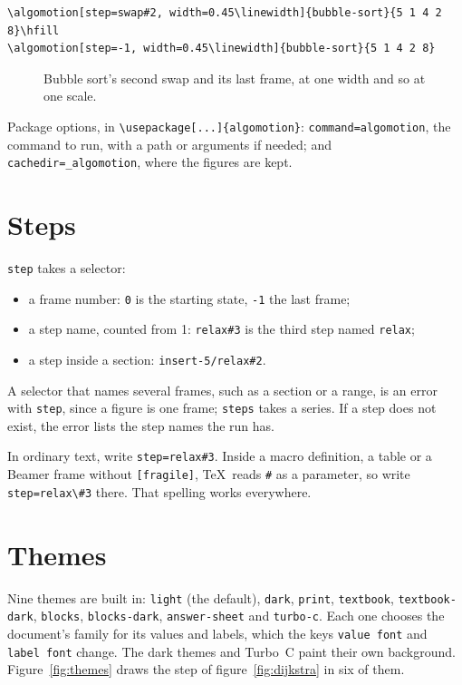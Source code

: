 \documentclass[11pt]{article}
\newcommand\cs[1]{\texttt{\textbackslash#1}}
\newcommand\key[1]{\texttt{#1}}
\begin{document}
\begin{lstlisting}
\algomotion[step=swap#2, width=0.45\linewidth]{bubble-sort}{5 1 4 2 8}\hfill
\algomotion[step=-1, width=0.45\linewidth]{bubble-sort}{5 1 4 2 8}
\end{lstlisting}

\begin{figure}[htbp]
  \centering
  \hfill
  \caption{Bubble sort's second swap and its last frame, at one width and so
    at one scale.}
\end{figure}

\noindent Package options, in \cs{usepackage}\texttt{[...]\{algomotion\}}:
\key{command=algomotion}, the command to run, with a path or arguments if
needed; and \key{cachedir=\_algomotion}, where the figures are kept.

\section{Steps}\label{sec:steps}

\key{step} takes a selector:
\begin{itemize}
  \item a frame number: \texttt{0} is the starting state, \texttt{-1} the
    last frame;
  \item a step name, counted from 1: \texttt{relax\#3} is the third step
    named \texttt{relax};
  \item a step inside a section: \texttt{insert-5/relax\#2}.
\end{itemize}
A selector that names several frames, such as a section or a range, is an
error with \key{step}, since a figure is one frame; \key{steps} takes a
series. If a step does not exist, the error lists the step names the run has.

In ordinary text, write \texttt{step=relax\#3}. Inside a macro definition, a
table or a Beamer frame without \texttt{[fragile]}, \TeX\ reads \texttt{\#}
as a parameter, so write \texttt{step=relax\textbackslash\#3} there. That
spelling works everywhere.

\section{Themes}\label{sec:themes}

Nine themes are built in: \texttt{light} (the default), \texttt{dark},
\texttt{print}, \texttt{textbook}, \texttt{textbook-dark}, \texttt{blocks},
\texttt{blocks-dark}, \texttt{answer-sheet} and \texttt{turbo-c}. Each one
chooses the document's family for its values and labels, which the keys
\key{value font} and \key{label font} change. The dark themes and Turbo~C
paint their own background. Figure~\ref{fig:themes} draws the step of
figure~\ref{fig:dijkstra} in six of them.
\end{document}
